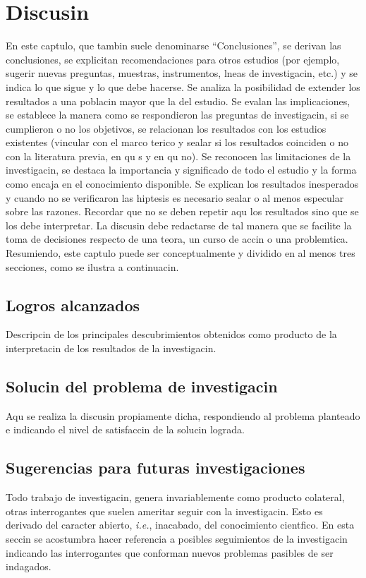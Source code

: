\fancyhead{}
\fancyfoot{}
\cfoot{\thepage}


\chapter{Discusin}

En este captulo, que tambin suele denominarse ``Conclusiones'', se derivan las conclusiones, se explicitan recomendaciones para otros estudios (por ejemplo, sugerir nuevas preguntas, muestras, instrumentos, lneas de investigacin, etc.) y se indica lo que sigue y lo que debe hacerse. Se analiza la posibilidad de extender los resultados a una poblacin mayor que la del estudio. Se evalan las implicaciones, se establece la manera como se respondieron las preguntas de investigacin, si se cumplieron o no los objetivos, se relacionan los resultados con los estudios existentes (vincular con el marco terico y sealar si los resultados coinciden o no con la literatura previa, en qu s y en qu no). Se reconocen las limitaciones de la investigacin, se destaca la importancia y significado de todo el estudio y la forma como encaja en el conocimiento disponible. Se explican los resultados inesperados y cuando no se verificaron las hiptesis es necesario sealar o al menos especular sobre las razones. Recordar que no se deben repetir aqu los resultados sino que se los debe interpretar. La discusin debe redactarse de tal manera que se facilite la toma de decisiones respecto de una teora, un curso de accin o una problemtica. Resumiendo, este captulo puede ser conceptualmente y dividido en al menos tres secciones, como se ilustra a continuacin.

\section{Logros alcanzados}
Descripcin de los principales descubrimientos obtenidos como producto de la interpretacin de los resultados de la investigacin.
\section{Solucin del problema de investigacin}
Aqu se realiza la discusin propiamente dicha, respondiendo al problema planteado e indicando el nivel de satisfaccin de la solucin lograda.
\section{Sugerencias para futuras investigaciones}
Todo trabajo de investigacin, genera invariablemente como producto colateral, otras interrogantes que suelen ameritar seguir con la investigacin. Esto es derivado del caracter abierto, \textit{i.e.}, inacabado, del conocimiento cientfico. En esta seccin se acostumbra hacer referencia a posibles seguimientos de la investigacin indicando las interrogantes que conforman nuevos problemas pasibles de ser indagados.   